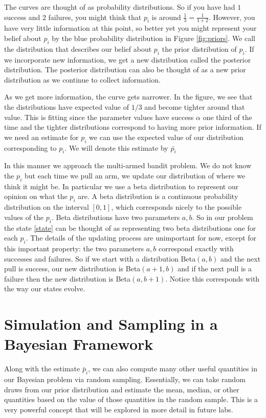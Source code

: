 The curves are thought of as probability distributions.  So if you have had $1$ success and $2$ failures, you might think that $p_i$ is around $\frac{1}{3} = \frac{1}{1+2}$. However, you have very little information at this point, so better yet you might represent your belief about $p_i$ by the blue probability distribution in Figure \ref{fig:priors}.  We call the distribution that describes our belief about $p_i$ the prior distribution of $p_i$.  If we incorporate new information, we get a new distribution called the posterior distribution.  The posterior distribution can also be thought of as a new prior distribution as we continue to collect information.

As we get more information, the curve gets narrower.  In the figure, we see that the distributions have expected value of $1/3$ and become tighter around that value.  This is fitting since the parameter values have success $\alpha$ one third of the time and the tighter distributions correspond to having more prior information.  If we need an estimate for $p_i$ we can use the expected value of our distribution corresponding to $p_i$.  We will denote this estimate by $\bar{p_i}$

In this manner we approach the multi-armed bandit problem.  We do not know the $p_i$ but each time we pull an arm, we update our distribution of where we think it might be.  In particular we use a beta distribution to represent our opinion on what the $p_i$ are.  A beta distribution is a continuous probability distribution on the interval $[0,1]$, which corresponds nicely to the possible values of the $p_i$.  Beta distributions have two parameters $a,b$.  So in our problem the state \eqref{state} can be thought of as representing two beta distributions one for each $p_i$. The details of the updating process are unimportant for now, except for this important property: the two parameters $a,b$ correspond exactly with successes and failures.  So if we start with a distribution Beta$(a,b)$ and the next pull is success, our new distribution is Beta$(a+1,b)$ and if the next pull is a failure then the new distribution is Beta$(a,b+1)$.  Notice this corresponds with the way our states evolve.

\section*{Simulation and Sampling in a Bayesian Framework}
Along with the estimate $\bar p_i$, we can also compute many other useful quantities in our Bayesian problem via random sampling.  Essentially, we can take random draws from our prior distribution and estimate the mean, median, or other quantities based on the value of those quantities in the random sample.  This is a very powerful concept that will be explored in more detail in future labs.

